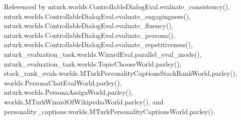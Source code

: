 Referenced by mturk.\+worlds.\+Controllable\+Dialog\+Eval.\+evaluate\+\_\+consistency(), mturk.\+worlds.\+Controllable\+Dialog\+Eval.\+evaluate\+\_\+engagingness(), mturk.\+worlds.\+Controllable\+Dialog\+Eval.\+evaluate\+\_\+fluency(), mturk.\+worlds.\+Controllable\+Dialog\+Eval.\+evaluate\+\_\+persona(), mturk.\+worlds.\+Controllable\+Dialog\+Eval.\+evaluate\+\_\+repetitiveness(), mturk\+\_\+evaluation\+\_\+task.\+worlds.\+Wizard\+Eval.\+parallel\+\_\+eval\+\_\+mode(), mturk\+\_\+evaluation\+\_\+task.\+worlds.\+Topic\+Choose\+World.\+parley(), stack\+\_\+rank\+\_\+evals.\+worlds.\+M\+Turk\+Personality\+Captions\+Stack\+Rank\+World.\+parley(), worlds.\+Persona\+Chat\+Eval\+World.\+parley(), mturk.\+worlds.\+Persona\+Assign\+World.\+parley(), worlds.\+M\+Turk\+Wizard\+Of\+Wikipedia\+World.\+parley(), and personality\+\_\+captions.\+worlds.\+M\+Turk\+Personality\+Captions\+World.\+parley().

